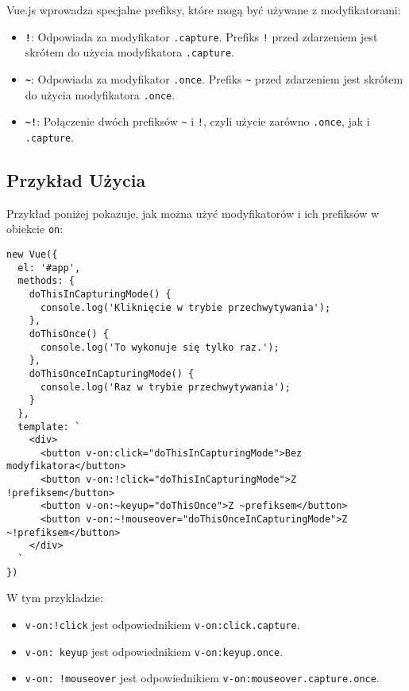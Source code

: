 \documentclass[a4paper,12pt]{article}
\begin{document}
Vue.js wprowadza specjalne prefiksy, które mogą być używane z modyfikatorami:

\begin{itemize}
    \item \textbf{\texttt{!}}: Odpowiada za modyfikator \texttt{.capture}. Prefiks \texttt{!} przed zdarzeniem jest skrótem do użycia modyfikatora \texttt{.capture}.
    \item \textbf{\texttt{\textasciitilde}}: Odpowiada za modyfikator \texttt{.once}. Prefiks \texttt{\textasciitilde} przed zdarzeniem jest skrótem do użycia modyfikatora \texttt{.once}.
    \item \textbf{\texttt{\textasciitilde!}}: Połączenie dwóch prefiksów \texttt{\textasciitilde} i \texttt{!}, czyli użycie zarówno \texttt{.once}, jak i \texttt{.capture}.
\end{itemize}

\subsection{Przykład Użycia}

Przykład poniżej pokazuje, jak można użyć modyfikatorów i ich prefiksów w obiekcie \texttt{on}:

\begin{lstlisting}
new Vue({
  el: '#app',
  methods: {
    doThisInCapturingMode() {
      console.log('Kliknięcie w trybie przechwytywania');
    },
    doThisOnce() {
      console.log('To wykonuje się tylko raz.');
    },
    doThisOnceInCapturingMode() {
      console.log('Raz w trybie przechwytywania');
    }
  },
  template: `
    <div>
      <button v-on:click="doThisInCapturingMode">Bez modyfikatora</button>
      <button v-on:!click="doThisInCapturingMode">Z !prefiksem</button>
      <button v-on:~keyup="doThisOnce">Z ~prefiksem</button>
      <button v-on:~!mouseover="doThisOnceInCapturingMode">Z ~!prefiksem</button>
    </div>
  `
})
\end{lstlisting}

W tym przykładzie:
\begin{itemize}
    \item \texttt{v-on:!click} jest odpowiednikiem \texttt{v-on:click.capture}.
    \item \texttt{v-on:~keyup} jest odpowiednikiem \texttt{v-on:keyup.once}.
    \item \texttt{v-on:~!mouseover} jest odpowiednikiem \texttt{v-on:mouseover.capture.once}.
\end{itemize}
\end{document}
